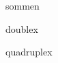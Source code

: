 \begin{algo}{somme}{n}
  \OD
\end{algo}

\begin{algo}{double}{x}
\end{algo}

\begin{algo}{quadruple}{x}
\end{algo}

